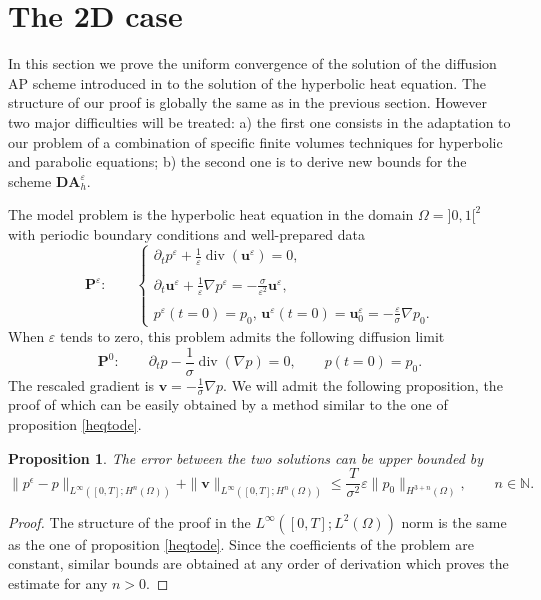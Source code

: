 \documentclass[a4paper,french,english,10pt]{article}
\newcommand\uu{\mathbf{u}}
\newcommand\eps{\varepsilon}
\newcommand{\ds}{\displaystyle}
\newtheorem{proposition}[theorem]{Proposition}
\begin{document}

\section{The 2D case}

In this section we prove the uniform 
convergence of the solution of the diffusion
AP 
 scheme introduced in \cite{glaceap} to the solution
of the hyperbolic heat equation.
The structure of our proof  
is globally the same
as in the previous section. However two major  difficulties
will be treated: a) the first one 
consists in  the adaptation to our problem
 of a  combination of specific finite volumes 
techniques for hyperbolic and parabolic equations;
b) the second one is to derive new bounds for the scheme $\mathbf{DA}_h^\eps$.

The model problem is the hyperbolic heat equation in the domain
$\Omega= ]0,1[^2$
with periodic boundary conditions and  well-prepared data
\begin{equation*}\label{HHE!}
\mathbf P^\eps: \qquad 
\left\{\begin{array}{l}
\ds\partial_t p^{\eps}+\frac{1}{\eps}\operatorname{div}(\uu^{\eps})=0,\\
\\
\ds\partial_t \uu^{\eps}+\frac{1}{\eps}\nabla
p^{\eps}=-\frac{\sigma}{\eps^2}\uu^{\eps},\\
\\
p^{\eps}(t=0)=p_0\mbox{,  }\uu^{\eps}(t=0)=\uu^{\eps}_0=
-\frac{\eps}\sigma
\nabla p_0.
 \end{array}\right.
\end{equation*}
When $\eps$ tends to zero,
this problem  admits the following diffusion  limit
\begin{equation*}\label{HHE!lim}
\mathbf P^0: \qquad
\ds\partial_t p-\frac{1}{\sigma}\operatorname{div}(\nabla{p})=0
, \qquad 
p(t=0)=p_0.  
\end{equation*}
The rescaled gradient is 
$
\mathbf v=-\frac{1}{\sigma} \nabla{p}$.
We will admit the following proposition, the proof of which can be easily obtained 
by a method similar to the one of proposition
\ref{heqtode}.

\begin{proposition}\label{heqtode2d}
The error between the two solutions
can be  upper bounded by
\begin{equation}\label{ine3}
\| p^\epsilon-p\|_{   L^\infty([0,T];H^n(\Omega))  }+
\| \mathbf{v} 
 \|_{   L^\infty([0,T]; H^n(\Omega))  }
 \leq
\frac{T}{\sigma^2} \eps
\|p_0 \|_{H^{3+n}(\Omega)},
\qquad n \in \mathbb N.
\end{equation}
\end{proposition}
\begin{proof}
The structure of the 
proof in the $L^\infty( [0,T];L^2(\Omega))$ norm is the same as the one
of proposition \ref{heqtode}.
Since the coefficients of the problem are constant, similar bounds are obtained
at any order of derivation which proves the estimate for any $n>0$.
\end{proof}
\end{document}
